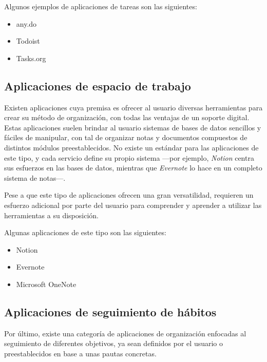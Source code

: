 \documentclass[10pt, a4paper]{aqademic}
\begin{document}
\medskip

Algunos ejemplos de aplicaciones de tareas son las siguientes:

\begin{itemize}
	\item any.do
	\item Todoist
	\item Tasks.org
\end{itemize}


\subsection*{Aplicaciones de espacio de trabajo}

Existen aplicaciones cuya premisa es ofrecer al usuario diversas herramientas para crear su método de organización, con todas las ventajas de un soporte digital. Estas aplicaciones suelen brindar al usuario sistemas de bases de datos sencillos y fáciles de manipular, con tal de organizar notas y documentos compuestos de distintos módulos preestablecidos. No existe un estándar para las aplicaciones de este tipo, y cada servicio define su propio sistema ---por ejemplo, \textit{Notion} centra sus esfuerzos en las bases de datos, mientras que \textit{Evernote} lo hace en un completo sistema de notas---.

\medskip

Pese a que este tipo de aplicaciones ofrecen una gran versatilidad, requieren un esfuerzo adicional por parte del usuario para comprender y aprender a utilizar las herramientas a su disposición. 

\medskip

Algunas aplicaciones de este tipo son las siguientes:

\begin{itemize}
	\item Notion
	\item Evernote
	\item Microsoft OneNote
\end{itemize}

\subsection*{Aplicaciones de seguimiento de hábitos}

Por último, existe una categoría de aplicaciones de organización enfocadas al seguimiento de diferentes objetivos, ya sean definidos por el usuario o preestablecidos en base a unas pautas concretas. 
\end{document}
